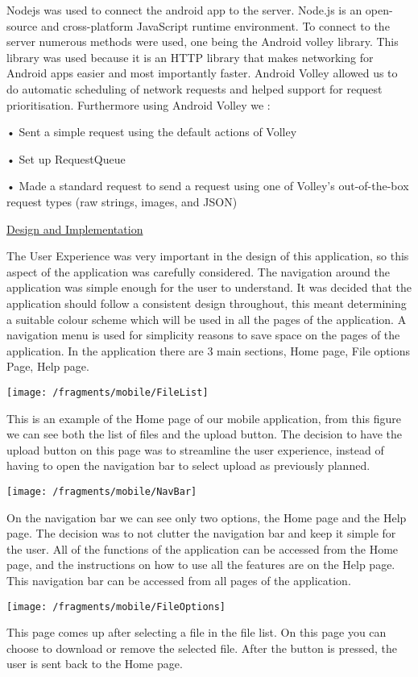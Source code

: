\documentclass{article}
\begin{document}
Nodejs was used to connect the android app to the server. Node.js is an open-source and cross-platform JavaScript runtime environment. To connect to the server numerous methods were used, one being the Android volley library. This library was used because it is an HTTP library that makes networking for Android apps easier and most importantly faster. Android Volley allowed us to do automatic scheduling of network requests and helped support for request prioritisation.  Furthermore using Android Volley we :

•	Sent a simple request using the default actions of Volley

•	Set up RequestQueue

•	Made a standard request to send a request using one of Volley's out-of-the-box request types (raw strings, images, and JSON)


\underline{Design and Implementation}

The User Experience was very important in the design of this application, so this aspect of the application was carefully considered. The navigation around the application was simple enough for the user to understand. It was decided that the application should follow a consistent design throughout, this meant determining a suitable colour scheme which will be used in all the pages of the application. A navigation menu is used for simplicity reasons to save space on the pages of the application. In the application there are 3 main sections, Home page, File options Page, Help page. 
\begin{center}
\texttt{[image: /fragments/mobile/FileList]}
\end{center}
This is an example of the Home page of our mobile application, from this figure we can see both the list of files and the upload button. The decision to have the upload button on this page was to streamline the user experience, instead of having to open the navigation bar to select upload as previously planned. 
\begin{center}
\texttt{[image: /fragments/mobile/NavBar]}
\end{center}
On the navigation bar we can see only two options, the Home page and the Help page. The decision was to not clutter the navigation bar and keep it simple for the user. All of the functions of the application can be accessed from the Home page, and the instructions on how to use all the features are on the Help page. This navigation bar can be accessed from all pages of the application.
\begin{center}
\texttt{[image: /fragments/mobile/FileOptions]}
\end{center}
This page comes up after selecting a file in the file list. On this page you can choose to download or remove the selected file. After the button is pressed, the user is sent back to the Home page.
\end{document}
